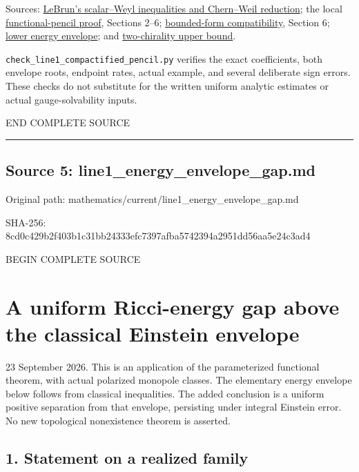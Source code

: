 \documentclass[
  10pt,
]{article}
\begin{document}
Sources: \href{https://arxiv.org/abs/math/0003068}{LeBrun's scalar--Weyl
inequalities and Chern--Weil reduction}; the local
\href{line1_functional_pencil.md}{functional-pencil proof}, Sections
2--6; \href{round21_analytic.md}{bounded-form compatibility}, Section 6;
\href{line1_energy_envelope_gap.md}{lower energy envelope}; and
\href{line1_two_chirality_topology.md}{two-chirality upper bound}.

\texttt{check\_line1\_compactified\_pencil.py} verifies the exact
coefficients, both envelope roots, endpoint rates, actual example, and
several deliberate sign errors. These checks do not substitute for the
written uniform analytic estimates or actual gauge-solvability inputs.

END COMPLETE SOURCE

\begin{center}\rule{0.5\linewidth}{0.5pt}\end{center}

\hypertarget{source-5-line1_energy_envelope_gap.md}{%
\subsection{Source 5:
line1\_energy\_envelope\_gap.md}\label{source-5-line1_energy_envelope_gap.md}}

Original path: mathematics/current/line1\_energy\_envelope\_gap.md

SHA-256:
8cd0c429b2f403b1c31bb24333efc7397afba5742394a2951dd56aa5e24c3ad4

BEGIN COMPLETE SOURCE

\hypertarget{a-uniform-ricci-energy-gap-above-the-classical-einstein-envelope}{%
\section{A uniform Ricci-energy gap above the classical Einstein
envelope}\label{a-uniform-ricci-energy-gap-above-the-classical-einstein-envelope}}

23 September 2026. This is an application of the parameterized
functional theorem, with actual polarized monopole classes. The
elementary energy envelope below follows from classical inequalities.
The added conclusion is a uniform positive separation from that
envelope, persisting under integral Einstein error. No new topological
nonexistence theorem is asserted.

\hypertarget{statement-on-a-realized-family}{%
\subsection{1. Statement on a realized
family}\label{statement-on-a-realized-family}}
\end{document}
